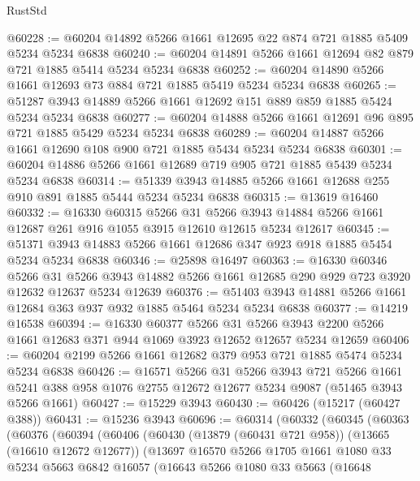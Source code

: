 \begin{lexlean}{RustStd}
\begin{coremodule}
@60228 := @60204 @14892 @5266 @1661 @12695 @22 @874 @721 @1885 @5409 @5234 @5234 @6838
@60240 := @60204 @14891 @5266 @1661 @12694 @82 @879 @721 @1885 @5414 @5234 @5234 @6838
@60252 := @60204 @14890 @5266 @1661 @12693 @73 @884 @721 @1885 @5419 @5234 @5234 @6838
@60265 := @51287 @3943 @14889 @5266 @1661 @12692 @151 @889 @859 @1885 @5424 @5234 @5234 @6838
@60277 := @60204 @14888 @5266 @1661 @12691 @96 @895 @721 @1885 @5429 @5234 @5234 @6838
@60289 := @60204 @14887 @5266 @1661 @12690 @108 @900 @721 @1885 @5434 @5234 @5234 @6838
@60301 := @60204 @14886 @5266 @1661 @12689 @719 @905 @721 @1885 @5439 @5234 @5234 @6838
@60314 := @51339 @3943 @14885 @5266 @1661 @12688 @255 @910 @891 @1885 @5444 @5234 @5234 @6838
@60315 := @13619 @16460
@60332 := @16330
    @60315
    @5266
    @31
    @5266
    @3943
    @14884
    @5266
    @1661
    @12687
    @261
    @916
    @1055
    @3915
    @12610
    @12615
    @5234
    @12617
@60345 := @51371 @3943 @14883 @5266 @1661 @12686 @347 @923 @918 @1885 @5454 @5234 @5234 @6838
@60346 := @25898 @16497
@60363 := @16330
    @60346
    @5266
    @31
    @5266
    @3943
    @14882
    @5266
    @1661
    @12685
    @290
    @929
    @723
    @3920
    @12632
    @12637
    @5234
    @12639
@60376 := @51403 @3943 @14881 @5266 @1661 @12684 @363 @937 @932 @1885 @5464 @5234 @5234 @6838
@60377 := @14219 @16538
@60394 := @16330
    @60377
    @5266
    @31
    @5266
    @3943
    @2200
    @5266
    @1661
    @12683
    @371
    @944
    @1069
    @3923
    @12652
    @12657
    @5234
    @12659
@60406 := @60204 @2199 @5266 @1661 @12682 @379 @953 @721 @1885 @5474 @5234 @5234 @6838
@60426 := @16571
    @5266
    @31
    @5266
    @3943
    @721
    @5266
    @1661
    @5241
    @388
    @958
    @1076
    @2755
    @12672
    @12677
    @5234
    @9087
    (@51465 @3943 @5266 @1661)
@60427 := @15229 @3943
@60430 := @60426 (@15217 (@60427 @388))
@60431 := @15236 @3943
@60696 := @60314
    (@60332
      (@60345
        (@60363
          (@60376
            (@60394
              (@60406
                (@60430
                  (@13879 (@60431 @721 @958))
                  (@13665 (@16610 @12672 @12677))
                  (@13697
                    @16570
                    @5266
                    @1705
                    @1661
                    @1080
                    @33
                    @5234
                    @5663
                    @6842
                    @16057
                    (@16643
                      @5266
                      @1080
                      @33
                      @5663
                      (@16648

\end{coremodule}
\end{lexlean}
